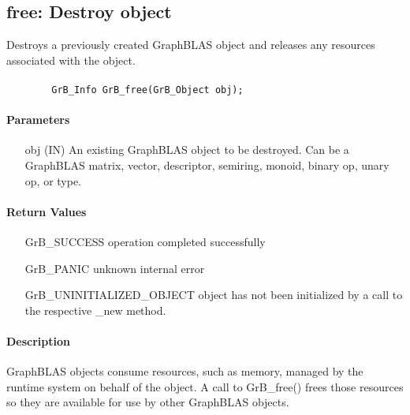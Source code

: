 \subsection{{\sf free}: Destroy object}

Destroys a previously created GraphBLAS object and releases any resources associated with the object.

\paragraph{\syntax}

\begin{verbatim}
        GrB_Info GrB_free(GrB_Object obj);
\end{verbatim}


\paragraph{Parameters}

\begin{itemize}[leftmargin=1.1in]
	\item[{\sf obj}] ({\sf IN}) An existing GraphBLAS object to be destroyed. 
    Can be a GraphBLAS matrix, vector, descriptor, semiring, monoid, binary op, 
    unary op, or type.
\end{itemize}

\paragraph{Return Values}

\begin{itemize}[leftmargin=2.1in]
\item[{\sf GrB\_SUCCESS}]        operation completed successfully
\item[{\sf GrB\_PANIC}]          unknown internal error
\item[{\sf GrB\_UNINITIALIZED\_OBJECT}]       object has not been initialized by a call 
                                 to the respective {\sf *\_new} method.
\end{itemize}

\paragraph{Description}

GraphBLAS objects consume resources, such as memory,  
managed by the runtime system on behalf of the object.  A call to {\sf GrB\_free()}
frees those resources so they are available for use by other GraphBLAS objects.


